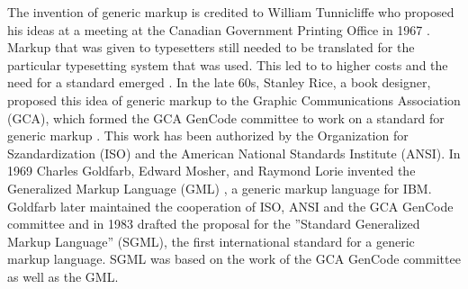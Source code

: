 The invention of generic markup is credited to William Tunnicliffe who proposed his ideas at a meeting at the Canadian
Government Printing Office in 1967 \cite{Goldfarb:1991:SH:102902}. Markup that was given to typesetters still needed to be translated for the particular typesetting system that was used. This led to to higher costs and the need for a standard emerged \cite{watsonhistory}. In the late 60s, Stanley Rice, a book designer, proposed this idea of generic markup to the Graphic Communications Association (GCA), which formed the GCA GenCode committee to work on a standard for generic markup \cite{Goldfarb:1991:SH:102902}. This work has been authorized by the Organization for Szandardization (ISO) and the American National Standards Institute (ANSI). In 1969 Charles Goldfarb, Edward Mosher, and Raymond Lorie invented the Generalized Markup Language (GML) \cite{watsonhistory}, a generic markup language for IBM. Goldfarb later maintained the cooperation of ISO, ANSI and the GCA GenCode committee and in 1983 drafted the proposal for the ''Standard Generalized Markup Language'' (SGML), the first international standard for a generic markup language. SGML was based on the work of the GCA GenCode committee as well as the GML.





